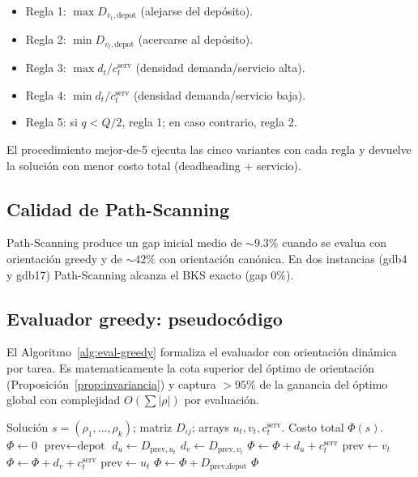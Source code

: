 \begin{itemize}
\item Regla 1: $\max D_{v_t, \text{depot}}$ (alejarse del depósito).
\item Regla 2: $\min D_{v_t, \text{depot}}$ (acercarse al depósito).
\item Regla 3: $\max d_t / c_t^{\text{serv}}$ (densidad demanda/servicio alta).
\item Regla 4: $\min d_t / c_t^{\text{serv}}$ (densidad demanda/servicio baja).
\item Regla 5: si $q < Q/2$, regla 1; en caso contrario, regla 2.
\end{itemize}

El procedimiento mejor-de-5 ejecuta las cinco variantes con cada regla
y devuelve la solución con menor costo total (deadheading + servicio).

\subsection{Calidad de Path-Scanning}

Path-Scanning produce un gap inicial medio de $\sim 9.3\%$ cuando se
evalua con orientación greedy y de $\sim 42\%$ con orientación
canónica. En dos instancias (gdb4 y gdb17) Path-Scanning alcanza el
BKS exacto (gap 0\%).

\subsection{Evaluador greedy: pseudocódigo}

El Algoritmo~\ref{alg:eval-greedy} formaliza el evaluador con
orientación dinámica por tarea. Es matematicamente la cota superior
del óptimo de orientación (Proposición~\ref{prop:invariancia}) y
captura $> 95\%$ de la ganancia del óptimo global con complejidad
$O(\sum |\rho|)$ por evaluación.

\begin{algorithm}[h]
\caption{Evaluador greedy con orientación dinámica por tarea.}
\label{alg:eval-greedy}
\begin{algorithmic}[1]
\Require Solución $s = (\rho_1, \dots, \rho_k)$; matriz $D_{ij}$;
  arrays $u_t, v_t, c_t^{\text{serv}}$.
\Ensure Costo total $\Phi(s)$.
\State $\Phi \gets 0$
  \State $\text{prev} \gets \text{depot}$
    \State $d_u \gets D_{\text{prev}, u_t}$
    \State $d_v \gets D_{\text{prev}, v_t}$
     
      \State $\Phi \gets \Phi + d_u + c_t^{\text{serv}}$
      \State $\text{prev} \gets v_t$
    \Else {}
      \State $\Phi \gets \Phi + d_v + c_t^{\text{serv}}$
      \State $\text{prev} \gets u_t$
    \EndIf
  \EndFor
  \State $\Phi \gets \Phi + D_{\text{prev}, \text{depot}}$
\EndFor
\State \Return $\Phi$
\end{algorithmic}
\end{algorithm}

